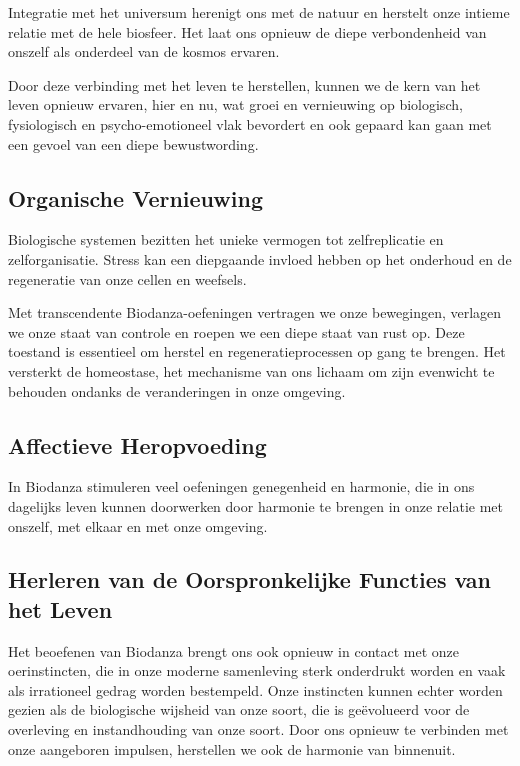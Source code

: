 \documentclass[
  11pt,
]{book}
\begin{document}
Integratie met het universum herenigt ons met de natuur en herstelt onze intieme relatie met de hele biosfeer. Het laat ons opnieuw de diepe verbondenheid van onszelf als onderdeel van de kosmos ervaren.

Door deze verbinding met het leven te herstellen, kunnen we de kern van het leven opnieuw ervaren, hier en nu, wat groei en vernieuwing op biologisch, fysiologisch en psycho-emotioneel vlak bevordert en ook gepaard kan gaan met een gevoel van een diepe bewustwording.

\hypertarget{organische-vernieuwing}{%
\subsection{Organische Vernieuwing}\label{organische-vernieuwing}}

Biologische systemen bezitten het unieke vermogen tot zelfreplicatie en zelforganisatie. Stress kan een diepgaande invloed hebben op het onderhoud en de regeneratie van onze cellen en weefsels.

Met transcendente Biodanza-oefeningen vertragen we onze bewegingen, verlagen we onze staat van controle en roepen we een diepe staat van rust op. Deze toestand is essentieel om herstel en regeneratieprocessen op gang te brengen. Het versterkt de homeostase, het mechanisme van ons lichaam om zijn evenwicht te behouden ondanks de veranderingen in onze omgeving.

\hypertarget{affectieve-heropvoeding}{%
\subsection{Affectieve Heropvoeding}\label{affectieve-heropvoeding}}

In Biodanza stimuleren veel oefeningen genegenheid en harmonie, die in ons dagelijks leven kunnen doorwerken door harmonie te brengen in onze relatie met onszelf, met elkaar en met onze omgeving.

\hypertarget{herleren-van-de-oorspronkelijke-functies-van-het-leven}{%
\subsection{Herleren van de Oorspronkelijke Functies van het Leven}\label{herleren-van-de-oorspronkelijke-functies-van-het-leven}}

Het beoefenen van Biodanza brengt ons ook opnieuw in contact met onze oerinstincten, die in onze moderne samenleving sterk onderdrukt worden en vaak als irrationeel gedrag worden bestempeld. Onze instincten kunnen echter worden gezien als de biologische wijsheid van onze soort, die is geëvolueerd voor de overleving en instandhouding van onze soort. Door ons opnieuw te verbinden met onze aangeboren impulsen, herstellen we ook de harmonie van binnenuit.
\end{document}
